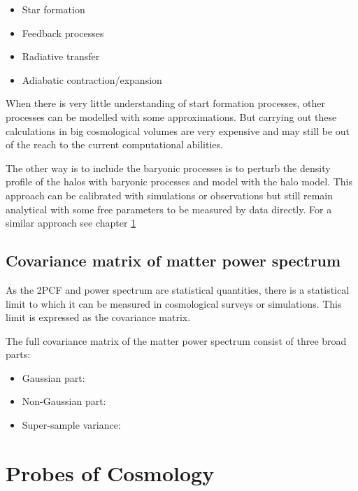 \begin{itemize}
	\item Star formation
	\item Feedback processes
	\item Radiative transfer
	\item Adiabatic contraction/expansion
\end{itemize}

When there is very little understanding of start formation processes, other processes can be 
modelled with some approximations. But carrying out these calculations in big cosmological 
volumes are very expensive and may still be out of the reach to the current computational 
abilities. 

The other way is to include the baryonic processes is to perturb the density profile 
of the halos with baryonic processes and model with the halo model. This approach can 
be calibrated with simulations or observations but still remain analytical with some 
free parameters to be measured by data directly. For a similar approach see chapter \ref{}



\subsection{Covariance matrix of matter power spectrum}
As the 2PCF and power spectrum are statistical quantities, there is a statistical limit
to which it can be measured in cosmological surveys or simulations. This limit is expressed
as the covariance matrix. 

The full covariance matrix of the matter power spectrum consist of three broad parts:

\begin{itemize}
	\item Gaussian part:
	\item Non-Gaussian part:
	\item Super-sample variance: 
\end{itemize}





\clearpage
\section{Probes of Cosmology}

